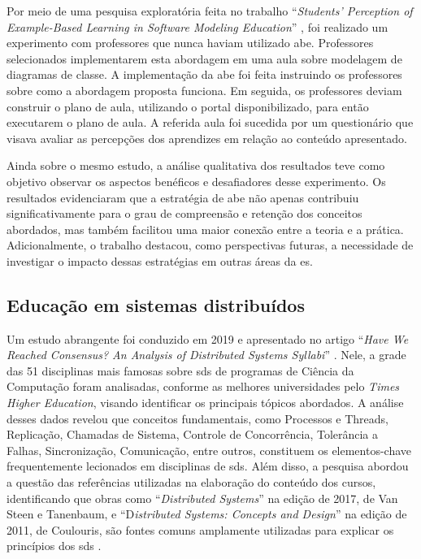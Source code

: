 Por meio de uma pesquisa exploratória feita no trabalho ``\textit{Students’ Perception of Example-Based Learning in Software Modeling Education}'' \cite{Tiago.Bonetti-etal:2023}, foi realizado um experimento com professores que nunca haviam utilizado \gls{abe}. Professores selecionados implementarem esta abordagem em uma aula sobre modelagem de diagramas de classe. A implementação da \gls{abe} foi feita instruindo os professores sobre como a abordagem proposta funciona. Em seguida, os professores deviam construir o plano de aula, utilizando o portal disponibilizado, para então executarem o plano de aula. A referida aula foi sucedida por um questionário que visava avaliar as percepções dos aprendizes em relação ao conteúdo apresentado. 

Ainda sobre o mesmo estudo, a análise qualitativa dos resultados teve como objetivo observar os aspectos benéficos e desafiadores desse experimento. Os resultados evidenciaram que a estratégia de \gls{abe} não apenas contribuiu significativamente para o grau de compreensão e retenção dos conceitos abordados, mas também facilitou uma maior conexão entre a teoria e a prática. Adicionalmente, o trabalho destacou, como perspectivas futuras, a necessidade de investigar o impacto dessas estratégias em outras áreas da \gls{es}.

\subsection{Educação em sistemas distribuídos}

Um estudo abrangente foi conduzido em 2019 e apresentado no artigo ``\textit{Have We Reached Consensus? An Analysis of Distributed Systems Syllabi}'' \cite{HaveWeReachedConsensus}. Nele, a grade das 51 disciplinas mais famosas sobre \gls{sds} de programas de Ciência da Computação foram analisadas, conforme as melhores universidades pelo \textit{Times Higher Education}, visando identificar os principais tópicos abordados. A análise desses dados revelou que conceitos fundamentais, como Processos e Threads, Replicação, Chamadas de Sistema, Controle de Concorrência, Tolerância a Falhas, Sincronização, Comunicação, entre outros, constituem os elementos-chave frequentemente lecionados em disciplinas de \gls{sds}. Além disso, a pesquisa abordou a questão das referências utilizadas na elaboração do conteúdo dos cursos, identificando que obras como ``\textit{Distributed Systems}'' na edição de 2017, de Van Steen e Tanenbaum, e ``D\textit{istributed Systems: Concepts and Design}'' na edição de 2011, de Coulouris, são fontes comuns amplamente utilizadas para explicar os princípios dos \gls{sds} \cite{HaveWeReachedConsensus}.

